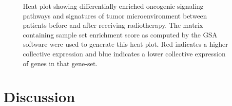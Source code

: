 \documentclass[hidelinks,11pt]{article}
\begin{document}
\begin{figure}[!ht]
\centering
{}
{}
\caption{Heat plot showing differentially enriched oncogenic signaling pathways and signatures of tumor microenvironment between patients before and after receiving radiotherapy. The matrix containing sample set enrichment score as computed by the GSA software were used to generate this heat plot. Red indicates a higher collective expression and blue indicates a lower collective expression of genes in that gene-set.}
\end{figure}

\section*{Discussion}
\end{document}
